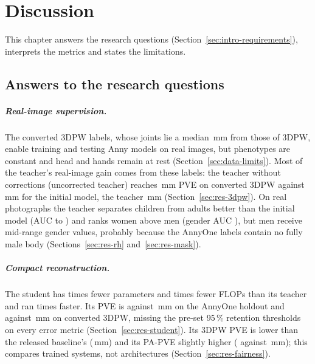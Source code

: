 \chapter{Discussion}
\label{ch:discussion}

This chapter answers the research questions (Section~\ref{sec:intro-requirements}), interprets the metrics and
states the limitations.

\section{Answers to the research questions}
\label{sec:disc-requirements}

\paragraph{Real-image supervision.}
The converted 3DPW labels, whose joints lie a median \DataCheckJointsNew\,mm from those of 3DPW, enable training
and testing Anny models on real images, but \DataConstantCount{} phenotypes are constant and head and hands
remain at rest (Section~\ref{sec:data-limits}). Most of the teacher's real-image gain comes from these labels: the teacher without
corrections (uncorrected teacher) reaches \ControlThreeDPW\,mm PVE on converted 3DPW against \BaseThreeDPW\,mm
for the initial model, the teacher \FinalThreeDPW\,mm (Section~\ref{sec:res-3dpw}). On real photographs the
teacher separates children from adults better than the initial model (AUC \RHAUCBase{} to \RHAUCFinal) and ranks
women above men (gender AUC \RHGenderAUCFinal), but men receive mid-range gender values, probably because the AnnyOne
labels contain no fully male body (Sections~\ref{sec:res-rh} and~\ref{sec:res-mask}).

\paragraph{Compact reconstruction.}
The student has \ParamRatioStudent{} times fewer parameters and \FlopRatioStudent{} times fewer FLOPs than its
teacher and ran \SpeedRatioStudent{} times faster. Its PVE is \StudentPVE{} against \FinalPVE\,mm on the AnnyOne
holdout and \StudentThreeDPW{} against \FinalThreeDPW\,mm on converted 3DPW, missing the pre-set 95\,\% retention thresholds on every error metric (Section~\ref{sec:res-student}). Its 3DPW PVE is lower than the released baseline's
(\NAVERThreeDPW\,mm) and its PA-PVE slightly higher (\StudentPAThreeDPW{} against \NAVERPAThreeDPW\,mm); this
compares trained systems, not architectures (Section~\ref{sec:res-fairness}).

